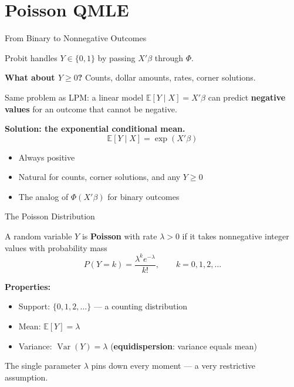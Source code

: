 \documentclass[aspectratio=169, handout, t]{beamer}
\numberwithin{equation}{section}
\begin{document}
\section{Poisson QMLE}

\begin{frame}{From Binary to Nonnegative Outcomes}

Probit handles $Y \in \{0,1\}$ by passing $X'\beta$ through $\Phi$.

\pause

\textbf{What about $Y \geq 0$?} Counts, dollar amounts, rates, corner solutions.

\pause

\bigskip

Same problem as LPM: a linear model $\mathbb{E}[Y \mid X] = X'\beta$ can predict \textbf{negative values} for an outcome that cannot be negative.

\pause

\bigskip

\textbf{Solution: the exponential conditional mean.}
\[
\mathbb{E}[Y \mid X] = \exp(X'\beta)
\]

\begin{itemize}
    \item Always positive
    \item Natural for counts, corner solutions, and any $Y \geq 0$
    \item The analog of $\Phi(X'\beta)$ for binary outcomes
\end{itemize}

\end{frame}


\begin{frame}{The Poisson Distribution}

A random variable $Y$ is \textbf{Poisson} with rate $\lambda > 0$ if it takes nonnegative integer values with probability mass
\[
P(Y = k) = \frac{\lambda^{k} e^{-\lambda}}{k!}, \qquad k = 0, 1, 2, \ldots
\]

\pause

\bigskip

\textbf{Properties:}
\begin{itemize}
    \item Support: $\{0, 1, 2, \ldots\}$ --- a counting distribution
    \item Mean: $\mathbb{E}[Y] = \lambda$
    \item Variance: $\operatorname{Var}(Y) = \lambda$ \quad (\textbf{equidispersion}: variance equals mean)
\end{itemize}

\pause

\bigskip

The single parameter $\lambda$ pins down every moment --- a very restrictive assumption.

\end{frame}
\end{document}
